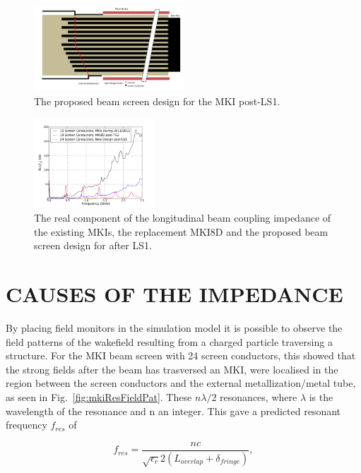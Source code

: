 \documentclass{JAC2003}
\begin{document}
\begin{figure}
\includegraphics[width=0.5\textwidth]{mki-final-design.pdf}
\caption{The proposed beam screen design for the MKI post-LS1.}
\label{fig:newScreenDesign}
\end{figure}

\begin{figure}
\begin{center}\includegraphics[width=0.4\textwidth]{realImp.pdf}
\caption{The real component of the longitudinal beam coupling impedance of the existing MKIs, the replacement MKI8D and the proposed beam screen design for after LS1.}
\label{fig:MKIScreenImp}
\end{center}
\end{figure}

\section{CAUSES OF THE IMPEDANCE}

By placing field monitors in the simulation model it is possible to observe the field patterns of the wakefield resulting from a charged particle traversing a structure. For the MKI beam screen with 24 screen conductors, this showed that the strong fields after the beam has trasversed an MKI, were localised in the region between the screen conductors and the external metallization/metal tube, as seen in Fig.~\ref{fig:mkiResFieldPat}. These $n \lambda /2$ resonances, where $\lambda$ is the wavelength of the resonance and n an integer. This gave a predicted resonant frequency $f_{res}$ of 

\begin{equation}
f_{res} = \frac{nc}{\sqrt{\epsilon_{r}}2 \left( L_{overlap} + \delta_{fringe} \right)},
\label{eqn:imp-overlap-fres}
\end{equation}
\end{document}
